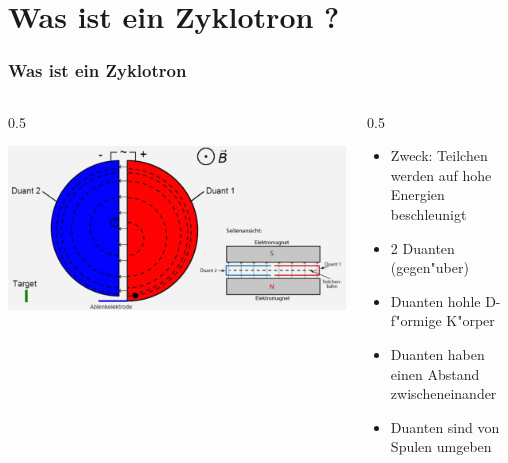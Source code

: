 \documentclass{beamer}
\begin{document}
\section{Was ist ein Zyklotron ?}
\frame{\tableofcontents[currentsection]}
\begin{frame}
\frametitle{Was ist ein Zyklotron}
  \begin{columns}[onlytextwidth,t]
    \begin{column} {0.5\textwidth}
      \begin{center}
         \includegraphics[width=\textwidth]{praes/Aufbau-Zyklotron-de.jpg}
         \footnotemark
        \end{center}
    \end{column}
    \begin{column} {0.5\textwidth}
      \begin{itemize}
        \item<1-> Zweck: Teilchen werden auf hohe Energien beschleunigt
        \item<2-> 2 Duanten (gegen"uber)
        \item<3-> Duanten hohle D-f"ormige K"orper
        \item<4-> Duanten haben einen Abstand zwischeneinander
        \item<5-> Duanten sind von Spulen umgeben
      \end{itemize}
    \end{column}
  \end{columns}
\end{frame}
\end{document}
